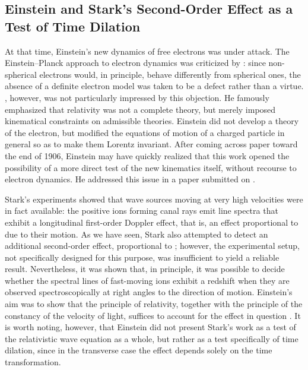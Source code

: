 \documentclass[submitted,12pt]{article}
\begin{document}
\subsection{Einstein and Stark’s Second-Order Effect as a Test of Time Dilation}
%
At that time, Einstein’s new dynamics of free electrons was under attack. The Einstein--Planck approach to electron dynamics was criticized by \citet{Ehrenfest1907}: since non-spherical electrons would, in principle, behave differently from spherical ones, the absence of a definite electron model was taken to be a defect rather than a virtue. \citet{Einstein1907a}, however, was not particularly impressed by this objection. He famously emphasized that relativity was not a complete theory, but merely imposed kinematical constraints on admissible theories. Einstein did not develop a theory of the electron, but modified the equations of motion of a charged particle in general so as to make them Lorentz invariant. After coming across  paper toward the end of 1906, Einstein may have quickly realized that this work opened the possibility of a more direct test of the new kinematics itself, without recourse to electron dynamics. He addressed this issue in a paper submitted on .

Stark’s experiments showed that wave sources moving at very high velocities were in fact available: the positive ions forming canal rays emit line spectra that exhibit a longitudinal first-order Doppler effect, that is, an effect proportional to \betafactorh due to their motion. As we have seen, Stark also attempted to detect an additional second-order effect, proportional to \betafactorsquaredh; however, the experimental setup, not specifically designed for this purpose, was insufficient to yield a reliable result. Nevertheless, it was shown that, in principle, it was possible to decide whether the spectral lines of fast-moving ions exhibit a redshift when they are observed spectroscopically at right angles to the direction of motion. Einstein’s aim was to show that the principle of relativity, together with the principle of the constancy of the velocity of light, suffices to account for the effect in question \citep[197]{Einstein1907d}. It is worth noting, however, that Einstein did not present Stark’s work as a test of the relativistic wave equation as a whole, but rather as a test specifically of time dilation, since in the transverse case the effect depends solely on the time transformation.

\end{document}
